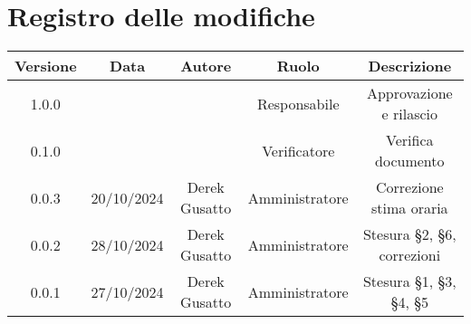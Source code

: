 
\section*{Registro delle modifiche}
\begin{table}[H]
    \begin{tabular}{|c|c|c|c|c|}
        \hline
         \textbf{Versione} &  \textbf{Data} &  \textbf{Autore} &  \textbf{Ruolo} & \textbf{Descrizione} \\
          \hline
          1.0.0&  &  & Responsabile & Approvazione e rilascio\\
          \hline
          0.1.0&  &  & Verificatore & Verifica documento \\
          \hline
          0.0.3&  20/10/2024&Derek Gusatto  & Amministratore &  Correzione stima oraria\\
          \hline
          0.0.2&  28/10/2024&Derek Gusatto  & Amministratore &  Stesura §2, §6, correzioni\\
          \hline
          0.0.1&  27/10/2024&Derek Gusatto  & Amministratore &  Stesura §1, §3, §4,  §5\\
          \hline
    \end{tabular}
\end{table}